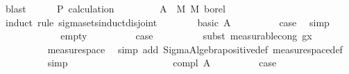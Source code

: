 \begin{isabellebody}
\ blast\isanewline
\ \ \ \ \isamarkupfalse%
\ P{\isacharparenleft}{\kern0pt}{}{\isacharparenright}{\kern0pt}\ calculation\isanewline
\ \ \ \ \isamarkupfalse%
\ {\isachardoublequoteopen}{\isacharparenleft}{\kern0pt}{\isasymlambda}{\isasymomega}{\isachardot}{\kern0pt}\ {\isasymkappa}\ {\isasymomega}\ A{\isacharprime}{\kern0pt}{\isacharparenright}{\kern0pt}\ {\isasymin}\ M\ {\isasymrightarrow}\isactrlsub M\ borel{\isachardoublequoteclose}\isanewline
\ \ \ \ \isamarkupfalse%
\ {\isacharparenleft}{\kern0pt}induct\ rule{\isacharcolon}{\kern0pt}\ sigma{\isacharunderscore}{\kern0pt}sets{\isacharunderscore}{\kern0pt}induct{\isacharunderscore}{\kern0pt}disjoint{\isacharparenright}{\kern0pt}\isanewline
\ \ \ \ \ \ \isamarkupfalse%
\ {\isacharparenleft}{\kern0pt}basic\ A{\isacharparenright}{\kern0pt}\isanewline
\ \ \ \ \ \ \isamarkupfalse%
\ \isamarkupfalse%
\ {\isacharquery}{\kern0pt}case\ \isamarkupfalse%
\ simp\isanewline
\ \ \ \ \isamarkupfalse%
\isanewline
\ \ \ \ \ \ \isamarkupfalse%
\ empty\isanewline
\ \ \ \ \ \ \isamarkupfalse%
\ \isamarkupfalse%
\ {\isacharquery}{\kern0pt}case\isanewline
\ \ \ \ \ \ \ \ \isamarkupfalse%
\ {\isacharparenleft}{\kern0pt}subst\ measurable{\isacharunderscore}{\kern0pt}cong{\isacharbrackleft}{\kern0pt}\ g{\isacharequal}{\kern0pt}{\isachardoublequoteopen}{\isasymlambda}x{\isachardot}{\kern0pt}\ {}{\isachardoublequoteclose}{\isacharbrackright}{\kern0pt}{\isacharparenright}{\kern0pt}\isanewline
\ \ \ \ \ \ \ \ \isamarkupfalse%
\ measure{\isacharunderscore}{\kern0pt}space\ \isamarkupfalse%
\ {\isacharparenleft}{\kern0pt}simp\ add{\isacharcolon}{\kern0pt}\ Sigma{\isacharunderscore}{\kern0pt}Algebra{\isachardot}{\kern0pt}positive{\isacharunderscore}{\kern0pt}def\ measure{\isacharunderscore}{\kern0pt}space{\isacharunderscore}{\kern0pt}def{\isacharparenright}{\kern0pt}\isanewline
\ \ \ \ \ \ \ \ \isamarkupfalse%
\ simp\isanewline
\ \ \ \ \ \ \ \ \isamarkupfalse%
\isanewline
\ \ \ \ \isamarkupfalse%
\isanewline
\ \ \ \ \ \ \isamarkupfalse%
\ {\isacharparenleft}{\kern0pt}compl\ A{\isacharparenright}{\kern0pt}\isanewline
\ \ \ \ \ \ \isamarkupfalse%
\ \isamarkupfalse%
\ {\isacharquery}{\kern0pt}case\isanewline
\ \ \ \ \ \ \ \ \isamarkupfalse%
\ \isanewline

\end{isabellebody}
